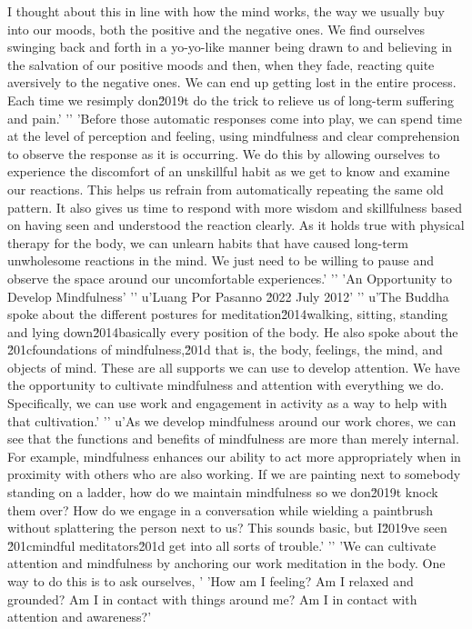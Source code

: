 I thought about this in line with how the mind works, the way we 
usually buy into our moods, both the positive and the negative ones. We 
find ourselves swinging back and forth in a yo-yo-like manner being 
drawn to and believing in the salvation of our positive moods and then, 
when they fade, reacting quite aversively to the negative ones. We can 
end up getting lost in the entire process. Each time we resimply don\u2019t do the trick to relieve us of long-term suffering and pain.'
'\n'
'Before those automatic responses come into play, we can spend time at the level of perception and feeling, using mindfulness and clear comprehension to observe the response as it is occurring. We do this by allowing ourselves to experience the discomfort of an unskillful habit as we get to know and examine our reactions. This helps us refrain from automatically repeating the same old pattern. It also gives us time to respond with more wisdom and skillfulness based on having seen and understood the reaction clearly. As it holds true with physical therapy for the body, we can unlearn habits that have caused long-term unwholesome reactions in the mind. We just need to be willing to pause and observe the space around our uncomfortable experiences.'
'\n'
'An Opportunity to Develop Mindfulness'
'\n'
u'Luang Por Pasanno \u2022 July 2012'
'\n'
u'The Buddha spoke about the different postures for meditation\u2014walking, sitting, standing and lying down\u2014basically every position of the body. He also spoke about the \u201cfoundations of mindfulness,\u201d that is, the body, feelings, the mind, and objects of mind. These are all supports we can use to develop attention. We have the opportunity to cultivate mindfulness and attention with everything we do. Specifically, we can use work and engagement in activity as a way to help with that cultivation.'
'\n'
u'As we develop mindfulness around our work chores, we can see that the functions and benefits of mindfulness are more than merely internal. For example, mindfulness enhances our ability to act more appropriately when in proximity with others who are also working. If we are painting next to somebody standing on a ladder, how do we maintain mindfulness so we don\u2019t knock them over? How do we engage in a conversation while wielding a paintbrush without splattering the person next to us? This sounds basic, but I\u2019ve seen \u201cmindful meditators\u201d get into all sorts of trouble.'
'\n'
'We can cultivate attention and mindfulness by anchoring our work meditation in the body. One way to do this is to ask ourselves, '
'How am I feeling? Am I relaxed and grounded? Am I in contact with things around me? Am I in contact with attention and awareness?'
